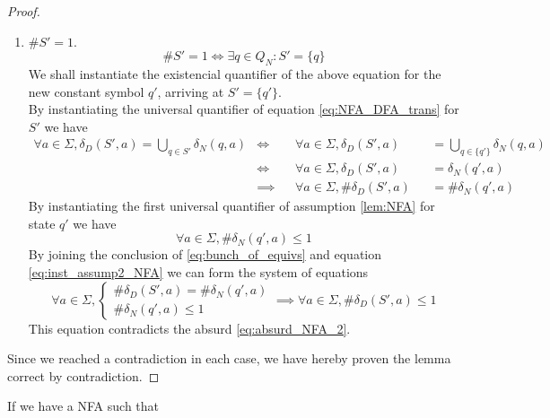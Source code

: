 \documentclass[docid=TP03]{tcom_TP}
\begin{document}
{\begin{proof}
\begin{enumerate}
\begin{equation}
				\iff \forall a \in \Sigma, \delta_D(S',a)=\emptyset
			\end{equation}
			which contradicts the absurd \eqref{eq:absurd_NFA_2}.
		\item $\#S'=1$.
			\begin{equation}
				\#S'=1 \iff \exists q \in Q_N\colon S'=\{q\}
			\end{equation}
			We shall instantiate the existencial quantifier of the above equation for the new constant symbol $q'$, arriving at $S'=\{q'\}$.\\
			By instantiating the universal quantifier of equation \eqref{eq:NFA_DFA_trans} for $S'$ we have
			\begin{equation} \label{eq:bunch_of_equivs}
			\begin{alignedat}{3}
				\forall a \in \Sigma, \delta_D(S',a)=\bigcup_{q\in S'}{\delta_N(q,a)}
				&\iff     && \forall a \in \Sigma, \delta_D(S',a)  &&=\bigcup_{q\in \{q'\}}{\delta_N(q,a)}\\
				&\iff     && \forall a \in \Sigma, \delta_D(S',a)  &&=\delta_N(q',a)\\
				&\implies && \forall a \in \Sigma, \#\delta_D(S',a)&&=\#\delta_N(q',a)
			\end{alignedat}
			\end{equation}
			By instantiating the first universal quantifier of assumption \eqref{lem:NFA} for state $q'$ we have
			\begin{equation} \label{eq:inst_assump2_NFA}
				\forall a \in \Sigma, \#\delta_N(q',a)\leq 1
			\end{equation}
			By joining the conclusion of \eqref{eq:bunch_of_equivs} and equation \eqref{eq:inst_assump2_NFA} we can form the system of equations
			\begin{equation}
				\forall a \in \Sigma, \begin{cases}
						\#\delta_D(S',a)=\#\delta_N(q',a)\\
						\#\delta_N(q',a)\leq 1
					\end{cases}
				\implies \forall a \in \Sigma, \#\delta_D(S',a)\leq 1
			\end{equation}
			This equation contradicts the absurd \eqref{eq:absurd_NFA_2}.
	\end{enumerate}
	Since we reached a contradiction in each case, we have hereby proven the lemma correct by contradiction. 
\end{proof}
\begin{theorem}
	If we have a NFA such that
	\begin{equation} \label{eq:assump_theor_NFA}

\end{equation}
\end{theorem}}
\end{document}
